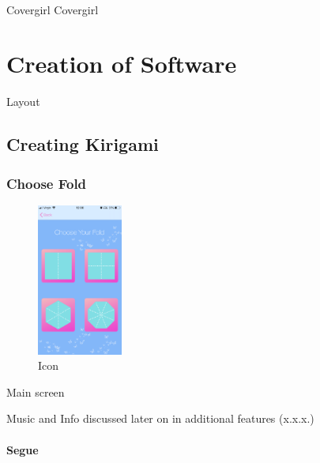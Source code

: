 \documentclass[11pt]{article}
\begin{document}
            
                \paragraph{}
                Covergirl Covergirl
            

\newpage
\section{Creation of Software}
Layout
    \subsection{Creating Kirigami}
            \paragraph{}
            \subsubsection{Choose Fold}
                \begin{figure}
                        \centering
                        \includegraphics[width=0.25\textwidth]{KiriZen/chooseFold.png}
                        \caption{Icon}
                        \label{fig:kiriZen-chooseFold}
                    \end{figure}
                    
            Main screen
            
            Music and Info discussed later on in additional features (x.x.x.)
            
          
            \paragraph{Segue}
\end{document}
